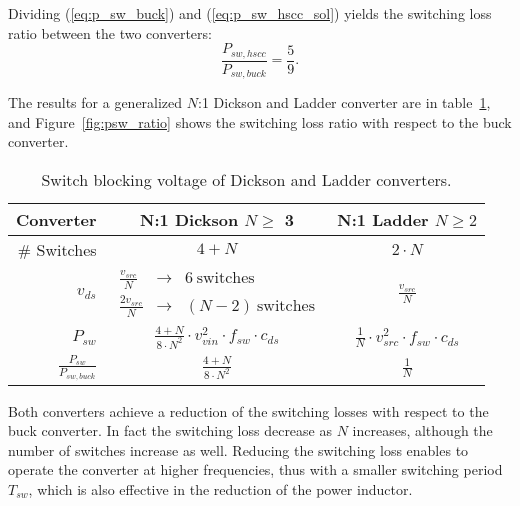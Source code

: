Dividing (\ref{eq:p_sw_buck}) and (\ref{eq:p_sw_hscc_sol}) yields the switching loss ratio between the two converters:
\begin{equation}
\frac{P_{sw,hscc}}{P_{sw,buck}} =  \frac{5}{9} .
\label{eq:p_sw_rel}
\end{equation}

The results for a generalized $N$:1 Dickson and Ladder converter are in table~\ref{tab:Dick_Ladder_v_blk}, and Figure~\ref{fig:psw_ratio} shows the switching loss ratio with respect to the buck converter.
\begin{table}[h]
\centering
\caption{Switch blocking voltage of Dickson and Ladder converters.}
\label{tab:Dick_Ladder_v_blk}
\renewcommand{\arraystretch}{1.5}%
\begin{tabular}{r | c  c   }
 Converter &  N:1 Dickson  $ N \geq$ 3  &  N:1 Ladder $ N \geq 2$  \\
 \midrule
\# Switches & $ 4 + N $  & $2 \cdot N$ \\
 $v_{ds}$ & $\begin{array} {rcl} \frac{v_{src}}{N}   & \to &  6~ \text{switches} \\
                                           \frac{2 v_{src}}{N} & \to &  (N - 2) ~\text{switches}
                       \end{array}$
                       &   $ \frac{v_{src}}{N} $ \\
 $ P_{sw}$ &  $ \frac{4+N}{8 \cdot N^2} \cdot v_{vin}^2 \cdot f_{sw}  \cdot {c_{ds}} $ &  $ \frac{1}{ N} \cdot v_{src}^2 \cdot f_{sw} \cdot {c_{ds}} $  \\
 $ \frac{P_{sw}}{P_{sw,buck}}$ &  $ \frac{4+N}{8 \cdot N^2}  $ &  $ \frac{1}{ N}  $  \\


 \end{tabular}
\end{table}

Both converters achieve a reduction of the switching losses with respect to the buck converter. In fact the switching loss decrease as $N$ increases, although the number of switches increase as well. Reducing the switching loss enables to operate the converter at higher frequencies, thus with a smaller switching period $T_{sw}$, which is also effective in the reduction of the power inductor.

